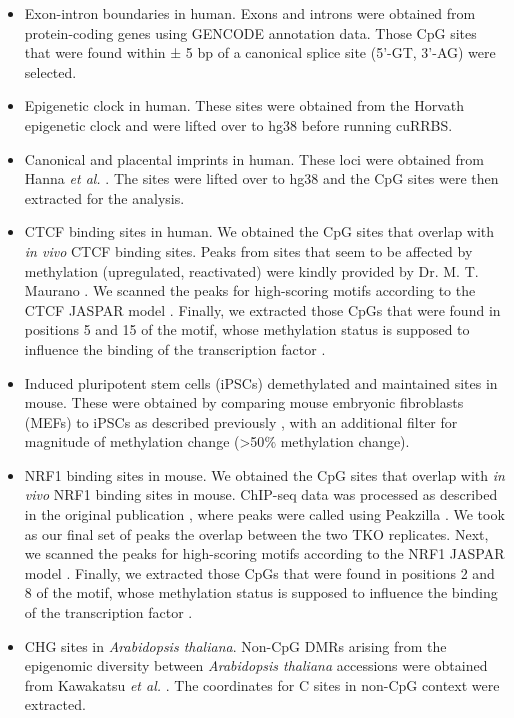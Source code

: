\begin{itemize}

	\item Exon-intron boundaries in human. Exons and introns were obtained from protein-coding genes using GENCODE annotation data. Those CpG sites that were found within ± 5 bp of a canonical splice site (5'-GT, 3'-AG) were selected.
	
	\item Epigenetic clock in human. These sites were obtained from the Horvath epigenetic clock \cite{Horvath2013} and were lifted over to hg38 \cite{Kuhn2012} before running cuRRBS.
	
	\item Canonical and placental imprints in human. These loci were obtained from Hanna \textit{et al.} \cite{Hanna2016}. The sites were lifted over to hg38 \cite{Kuhn2012} and the CpG sites were then extracted for the analysis. 
	
	\item \acrshort{CTCF} binding sites in human. We obtained the CpG sites that overlap with \textit{in vivo} CTCF binding sites. Peaks from sites that seem to be affected by methylation (upregulated, reactivated) were kindly provided by Dr. M. T. Maurano \cite{Maurano2015}. We scanned the peaks for high-scoring motifs according to the CTCF JASPAR model \cite{Zhang2015a}. Finally, we extracted those CpGs that were found in positions 5 and 15 of the motif, whose methylation status is supposed to influence the binding of the transcription factor \cite{Maurano2015}. 
	
	\item Induced pluripotent stem cells (\acrshort{iPSCs}) demethylated and maintained sites in mouse. These were obtained by comparing mouse embryonic fibroblasts (\acrshort{MEFs}) to iPSCs as described previously \cite{Milagre2017}, with an additional filter for magnitude of methylation change (>50$\%$ methylation change).
	
	\item \acrshort{NRF1} binding sites in mouse. We obtained the CpG sites that overlap with \textit{in vivo} NRF1 binding sites in mouse. \acrshort{ChIP-seq} data was processed as described in the original publication \cite{Domcke2015}, where peaks were called using Peakzilla \cite{Bardet2013}. We took as our final set of peaks the overlap between the two \acrshort{TKO} replicates. Next, we scanned the peaks for high-scoring motifs according to the NRF1 JASPAR model \cite{Zhang2015a}. Finally, we extracted those CpGs that were found in positions 2 and 8 of the motif, whose methylation status is supposed to influence the binding of the transcription factor \cite{Zhang2015a}.
	
	\item CHG sites in \textit{Arabidopsis thaliana}. Non-CpG DMRs arising from the epigenomic diversity between \textit{Arabidopsis thaliana} accessions were obtained from Kawakatsu \textit{et al.} \cite{Kawakatsu2016}. The coordinates for C sites in non-CpG context were extracted.
	
	
\end{itemize}

